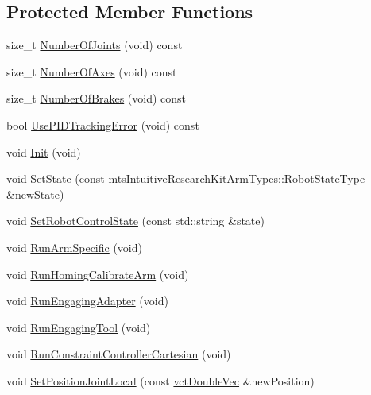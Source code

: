 \subsection*{Protected Member Functions}
\begin{DoxyCompactItemize}
\item 
size\+\_\+t \hyperlink{classmts_intuitive_research_kit_p_s_m_a658ddc12e7550eba51f7752a071fdec8}{Number\+Of\+Joints} (void) const 
\item 
size\+\_\+t \hyperlink{classmts_intuitive_research_kit_p_s_m_aed9503acb416c319c5d3b7e016dc28d9}{Number\+Of\+Axes} (void) const 
\item 
size\+\_\+t \hyperlink{classmts_intuitive_research_kit_p_s_m_ac1e54884506cb71ebd758705505bcd04}{Number\+Of\+Brakes} (void) const 
\item 
bool \hyperlink{classmts_intuitive_research_kit_p_s_m_aafcc1c6ba32a21cccd3c575130c4844a}{Use\+P\+I\+D\+Tracking\+Error} (void) const 
\item 
void \hyperlink{classmts_intuitive_research_kit_p_s_m_aedd95487ba1a9f92188b628b8d6cc6f2}{Init} (void)
\item 
void \hyperlink{classmts_intuitive_research_kit_p_s_m_a0149b1fd141ad034d0e2169859a003bf}{Set\+State} (const mts\+Intuitive\+Research\+Kit\+Arm\+Types\+::\+Robot\+State\+Type \&new\+State)
\item 
void \hyperlink{classmts_intuitive_research_kit_p_s_m_a8e0988ba33c89dd6cf9f4a02daa25820}{Set\+Robot\+Control\+State} (const std\+::string \&state)
\item 
void \hyperlink{classmts_intuitive_research_kit_p_s_m_a342233d48e38ff7d1141e7e8412b9d2a}{Run\+Arm\+Specific} (void)
\item 
void \hyperlink{classmts_intuitive_research_kit_p_s_m_a78cb115da7d404effea18992c1514222}{Run\+Homing\+Calibrate\+Arm} (void)
\item 
void \hyperlink{classmts_intuitive_research_kit_p_s_m_adca90ab2aaf26196a0826a3ab877c471}{Run\+Engaging\+Adapter} (void)
\item 
void \hyperlink{classmts_intuitive_research_kit_p_s_m_a0c692ca79bf331140654b3f44d51abe3}{Run\+Engaging\+Tool} (void)
\item 
void \hyperlink{classmts_intuitive_research_kit_p_s_m_a88eaa498fe7cf4b26c8759a9c3aa1b01}{Run\+Constraint\+Controller\+Cartesian} (void)
\item 
void \hyperlink{classmts_intuitive_research_kit_p_s_m_ad7c79ae76ae7dce4feee27722b809bb5}{Set\+Position\+Joint\+Local} (const \hyperlink{vct_dynamic_vector_types_8h_ade4b3068c86fb88f41af2e5187e491c2}{vct\+Double\+Vec} \&new\+Position)

\end{DoxyCompactItemize}
